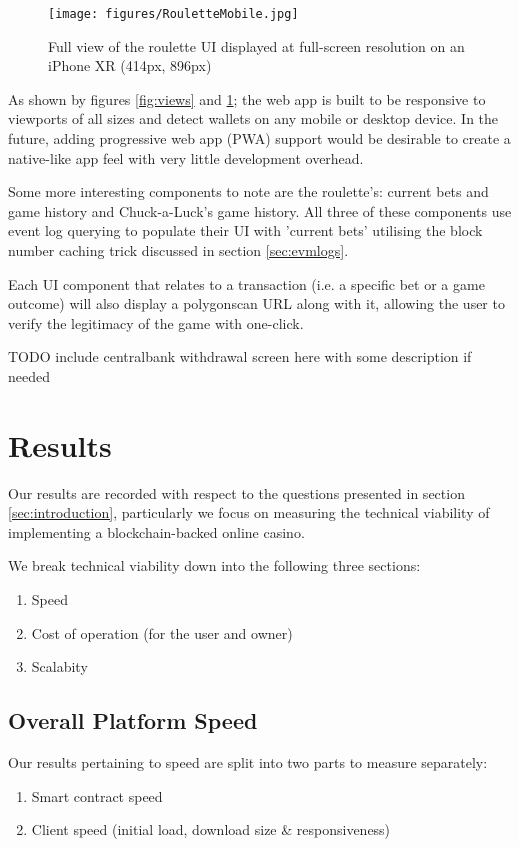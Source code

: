\documentclass[10pt,journal,compsoc]{IEEEtran}
\begin{document}
\begin{figure}[!h]
    \centering
    \texttt{[image: figures/RouletteMobile.jpg]}
    \caption{Full view of the roulette UI displayed at full-screen resolution on an iPhone XR (414px, 896px)}
    \label{fig:viewsmobile}
\end{figure}

As shown by figures \ref{fig:views} and \ref{fig:viewsmobile}; the web app is built to be responsive to viewports of all sizes and detect wallets on any mobile or desktop device. In the future, adding progressive web app (PWA) support would be desirable to create a native-like app feel with very little development overhead.

Some more interesting components to note are the roulette's: current bets and game history and Chuck-a-Luck's game history. All three of these components use event log querying to populate their UI with 'current bets' utilising the block number caching trick discussed in section \ref{sec:evmlogs}.

Each UI component that relates to a transaction (i.e. a specific bet or a game outcome) will also display a polygonscan URL along with it, allowing the user to verify the legitimacy of the game with one-click.

TODO include centralbank withdrawal screen here with some description if needed
\section{Results}
\label{sec:results}
Our results are recorded with respect to the questions presented in section \ref{sec:introduction}, particularly we focus on measuring the technical viability of implementing a blockchain-backed online casino.

We break technical viability down into the following three sections:
\begin{enumerate}
    \item Speed
    \item Cost of operation (for the user and owner)
    \item Scalabity
\end{enumerate}

\subsection{Overall Platform Speed}
Our results pertaining to speed are split into two parts to measure separately:
\begin{enumerate}
    \item Smart contract speed
    \item Client speed (initial load, download size \& responsiveness)
\end{enumerate}
\end{document}
